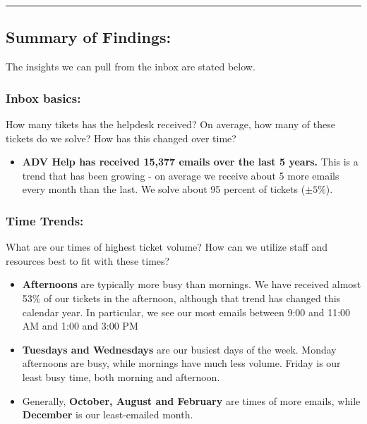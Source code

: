 \documentclass[11pt]{article}
\providecommand{\tightlist}{%
      \setlength{\itemsep}{0pt}\setlength{\parskip}{0pt}}
\begin{document}
    \begin{center}\rule{0.5\linewidth}{\linethickness}\end{center}

\hypertarget{summary-of-findings}{%
\subsection{Summary of Findings:}\label{summary-of-findings}}

The insights we can pull from the inbox are stated below.

\hypertarget{inbox-basics}{%
\subsubsection{Inbox basics:}\label{inbox-basics}}

How many tikets has the helpdesk received? On average, how many of these
tickets do we solve? How has this changed over time?

\begin{itemize}
\tightlist
\item
  \textbf{ADV Help has received 15,377 emails over the last 5 years.}
  This is a trend that has been growing - on average we receive about 5
  more emails every month than the last. We solve about 95 percent of
  tickets (\(\pm5 \%\)).
\end{itemize}

\hypertarget{time-trends}{%
\subsubsection{Time Trends:}\label{time-trends}}

What are our times of highest ticket volume? How can we utilize staff
and resources best to fit with these times?

\begin{itemize}
\item
  \textbf{Afternoons} are typically more busy than mornings. We have
  received almost 53\% of our tickets in the afternoon, although that
  trend has changed this calendar year. In particular, we see our most
  emails between 9:00 and 11:00 AM and 1:00 and 3:00 PM 
\item
  \textbf{Tuesdays and Wednesdays} are our busiest days of the week.
  Monday afternoons are busy, while mornings have much less volume.
  Friday is our least busy time, both morning and afternoon. 
\item
  Generally, \textbf{October, August and February} are times of more
  emails, while \textbf{December} is our least-emailed month.
\end{itemize}
\end{document}

